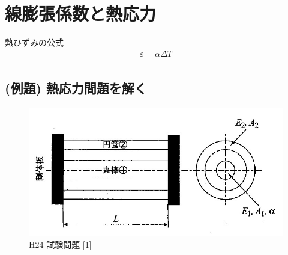 \documentclass[a4paper]{jsarticle}
\begin{document}
\section{線膨張係数と熱応力}
\begin{itembox}[l]{熱ひずみの公式}
    \begin{eqnarray*}
        \varepsilon=\alpha\Delta T\\
    \end{eqnarray*}
\end{itembox}

\subsection{(例題) 熱応力問題を解く}
\begin{figure}[htbp]
    \begin{center}
        \includegraphics[width=120mm]{images/zairiki_image4.jpg}
        \caption{H24 試験問題 [1]}
    \end{center}
\end{figure}
\end{document}
